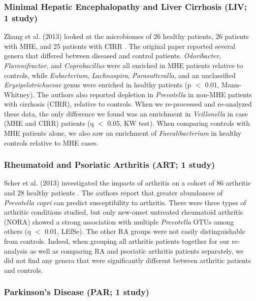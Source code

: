 \subsubsection{Minimal Hepatic Encephalopathy and Liver Cirrhosis (LIV; 1 study)}

Zhang et al. (2013) looked at the microbiomes of 26 healthy patients, 26 patients with MHE, and 25 patients with CIRR \cite{mhe-zhang}.
The original paper reported several genera that differed between diseased and control patients. \textit{Odoribacter}, \textit{Flavonifractor}, and \textit{Coprobacillus} were all enriched in MHE patients relative to controls, while \textit{Eubacterium}, \textit{Lachnospira}, \textit{Parasutteralla}, and an unclassified \textit{Erysipelotrichaceae} genus were enriched in healthy patients (p $<$ 0.01, Mann-Whitney).
The authors also reported depletion in \textit{Prevotella} in non-MHE patients with cirrhosis (CIRR), relative to controls.
When we re-processed and re-analyzed these data, the only difference we found was an enrichment in \textit{Veillonella} in case (MHE and CIRR) patients (q $<$ 0.05, KW test).
When comparing controls with MHE patients alone, we also saw an enrichment of \textit{Faecalibacterium} in healthy controls relative to MHE cases.

\subsubsection{Rheumatoid and Psoriatic Arthritis (ART; 1 study)}

Scher et al. (2013) investigated the impacts of arthritis on a cohort of 86 arthritic and 28 healthy patients \cite{ra-littman}.
The authors report that greater abundances of \textit{Prevotella copri} can predict susceptibility to arthritis.
There were three types of arthritic conditions studied, but only new-onset untreated rheumatoid arthritis (NORA) showed a strong association with multiple \textit{Prevotella} OTUs among others (q $<$ 0.01, LEfSe).
The other RA groups were not easily distinguishable from controls.
Indeed, when grouping all arthritis patients together for our re-analysis as well as comparing RA and psoriatic arthritis patients separately, we did not find any genera that were significantly different between arthritic patients and controls.

\subsubsection{Parkinson's Disease (PAR; 1 study)}

